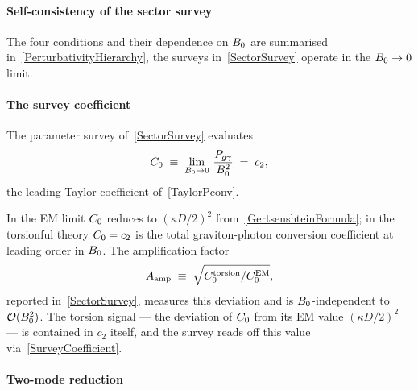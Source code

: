 \paragraph*{Self-consistency of the sector survey}

The four conditions and their dependence on $B_0$
are summarised in~\cref{PerturbativityHierarchy}, the
surveys in~\cref{SectorSurvey} operate in the $B_0\to 0$ limit.

\paragraph*{The survey coefficient}

The parameter survey of~\cref{SectorSurvey} evaluates
\begin{align}
  C_0 \;\equiv\; \lim_{B_0\to 0}\,\frac{P_{g\gamma}}{B_0^2}
  \;=\; c_2 ,
  \label{SurveyCoefficient}
\end{align}
the leading Taylor coefficient of~\cref{TaylorPconv}.

In the EM limit $C_0$ reduces to $(\kappa D/2)^2$
from~\cref{GertsenshteinFormula}; in the torsionful theory $C_0=c_2$
is the total graviton-photon conversion coefficient at leading order in
$B_0$.
The amplification factor
\begin{align}
  A_\mathrm{amp} \;\equiv\; \sqrt{C_0^{\mathrm{torsion}}/C_0^{\mathrm{EM}}},
  \label{AmplificationFactor}
\end{align}
reported in~\cref{SectorSurvey}, measures this deviation and is
$B_0$-independent to $\mathcal{O}(B_0^2)$.
The torsion signal --- the deviation of $C_0$ from its
EM value $(\kappa D/2)^2$ --- is contained in $c_2$
itself,
and the survey reads off
this value via~\cref{SurveyCoefficient}.

\paragraph*{Two-mode reduction}

